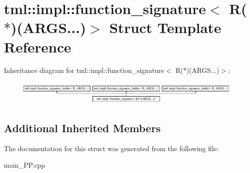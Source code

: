 \hypertarget{structtml_1_1impl_1_1function__signature_3_01R_07_5_08_07ARGS_8_8_8_08_4}{\section{tml\+:\+:impl\+:\+:function\+\_\+signature$<$ R($\ast$)(A\+R\+G\+S...)$>$ Struct Template Reference}
\label{structtml_1_1impl_1_1function__signature_3_01R_07_5_08_07ARGS_8_8_8_08_4}
}
Inheritance diagram for tml\+:\+:impl\+:\+:function\+\_\+signature$<$ R($\ast$)(A\+R\+G\+S...)$>$\+:\begin{figure}[H]
\begin{center}
\leavevmode
\includegraphics[height=1.252796cm]{structtml_1_1impl_1_1function__signature_3_01R_07_5_08_07ARGS_8_8_8_08_4}
\end{center}
\end{figure}
\subsection*{Additional Inherited Members}


The documentation for this struct was generated from the following file\+:\begin{DoxyCompactItemize}
\item 
main\+\_\+\+P\+P.\+cpp\end{DoxyCompactItemize}
